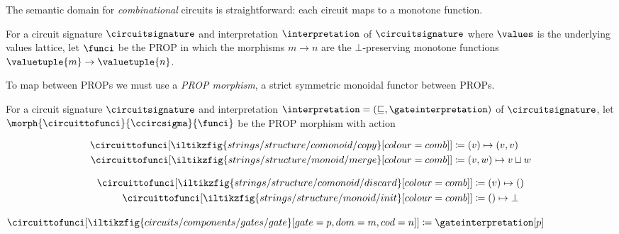 \documentclass{lmcs}
\begin{document}
The semantic domain for \emph{combinational} circuits is straightforward: each
circuit maps to a monotone function.

\begin{defi}
    For a circuit signature \(\circuitsignature\) and interpretation
    \(\interpretation\) of \(\circuitsignature\) where \(\values\) is the
    underlying values lattice, let
    \(\funci\) be the PROP in which the morphisms \(m \to n\) are the
    \(\bot\)-preserving monotone functions
    \(\valuetuple{m} \to \valuetuple{n}\).
\end{defi}

To map between PROPs we must use a \emph{PROP morphism}, a strict symmetric
monoidal functor between PROPs.

\begin{defi}
    For a circuit signature \(\circuitsignature\) and interpretation
    \(\interpretation = \left(\sqsubseteq, \gateinterpretation\right)\) of
    \(\circuitsignature\), let \(\morph{\circuittofunci}{\ccircsigma}{\funci}\)
    be the PROP morphism with action%
    \vspace{-\abovedisplayskip}
    \begin{center}
        \begin{minipage}{0.32\textwidth}
            \centering
            \begin{align*}
                \circuittofunci[
                    \iltikzfig{strings/structure/comonoid/copy}[colour=comb]
                ]
                 & \coloneqq
                (v) \mapsto (v, v)
                \\
                \circuittofunci[
                    \iltikzfig{strings/structure/monoid/merge}[colour=comb]
                ]
                 & \coloneqq
                (v, w) \mapsto v \sqcup w
            \end{align*}
        \end{minipage}
        \quad
        \begin{minipage}{0.25\textwidth}
            \centering
            \begin{align*}
                \circuittofunci[
                    \iltikzfig{strings/structure/comonoid/discard}[colour=comb]
                ]
                 & \coloneqq
                (v) \mapsto ()
                \\
                \circuittofunci[
                    \iltikzfig{strings/structure/monoid/init}[colour=comb]
                ]
                 & \coloneqq
                () \mapsto \bot
            \end{align*}
        \end{minipage}
        \quad
        \begin{minipage}{0.25\textwidth}
            \centering
            \vspace{1.5em}
            \(\circuittofunci[
                \iltikzfig{circuits/components/gates/gate}[gate=p,dom=m,cod=n]
            ]
            \coloneqq
            \gateinterpretation[p]
            \)
        \end{minipage}
    \end{center}
\end{defi}
\end{document}
